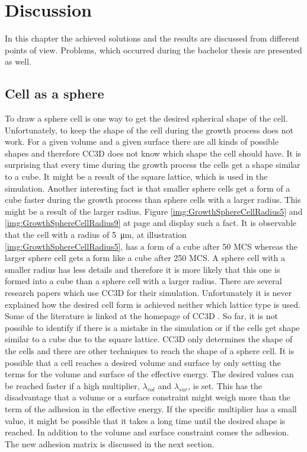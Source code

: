 \chapter{Discussion}
In this chapter the achieved solutions and the results are discussed from different points of view. Problems, which occurred during the bachelor thesis are presented as well.

\section{Cell as a sphere}
To draw a sphere cell is one way to get the desired spherical shape of the cell. Unfortunately, to keep the shape of the cell during the growth process does not work. For a given volume and a given surface there are all kinds of possible shapes and therefore \ac{CC3D} does not know which shape the cell should have. It is surprising that every time during the growth process the cells get a shape similar to a cube. It might be a result of the square lattice, which is used in the simulation. Another interesting fact is that smaller sphere cells get a form of a cube faster during the growth process than sphere cells with a larger radius. This might be a result of the larger radius. Figure \ref{img:GrowthSphereCellRadius5} and \ref{img:GrowthSphereCellRadius9} at page \pageref{img:GrowthSphereCellRadius5} and \pageref{img:GrowthSphereCellRadius9} display such a fact. It is observable that the cell with a radius of \SI{5}{\micro\metre}, at illustration \ref{img:GrowthSphereCellRadius5}, has a form of a cube after 50 \ac{MCS} whereas the larger sphere cell gets a form like a cube after 250 \ac{MCS}. A sphere cell with a smaller radius has less details and therefore it is more likely that this one is formed into a cube than a sphere cell with a larger radius. \newline
There are several research papers which use \ac{CC3D} for their simulation. Unfortunately it is never explained how the desired cell form is achieved neither which lattice type is used. Some of the literature is linked at the homepage of \ac{CC3D} \cite{CC3D.org}. So far, it is not possible to identify if there is a mistake in the simulation or if the cells get shape similar to a cube due to the square lattice. \newline
\ac{CC3D} only determines the shape of the cells and there are other techniques to reach the shape of a sphere cell. It is possible that a cell reaches a desired volume and surface by only setting the terms for the volume and surface of the effective energy. The desired values can be reached faster if a high multiplier, $\lambda_{vol}$ and $\lambda_{sur}$, is set. This has the disadvantage that a volume or a surface constraint might weigh more than the term of the adhesion in the effective energy. If the specific multiplier has a small value, it might be possible that it takes a long time until the desired shape is reached. In addition to the volume and surface constraint comes the adhesion. The new adhesion matrix is discussed in the next section.


